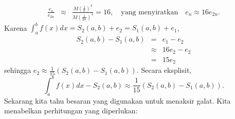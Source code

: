 \begin{description}
\begin{eqnarray*}
\frac{e_{n}}{e_{2n}} & \approx & \frac{M\left(\frac{1}{n}\right)^{4}}{M\left(\frac{1}{2n}\right)^{4}}=16,\quad\mbox{yang menyiratkan}\quad e_{n}\approx16e_{2n}.
\end{eqnarray*}
Karena $\int_{a}^{b}f(x)dx=S_{2}(a,b)+e_{2}=S_{1}(a,b)+e_{1}$,
\begin{eqnarray*}
S_{2}(a,b)-S_{1}(a,b) & = & e_{1}-e_{2}\\
 & \approx & 16e_{2}-e_{2}\\
 & = & 15e_{2}
\end{eqnarray*}
sehingga $e_{2}\approx\frac{1}{15}(S_{2}(a,b)-S_{1}(a,b)).$ Secara
eksplisit, 
\[
\int_{a}^{b}f(x)dx-S_{2}(a,b)\approx\frac{1}{15}(S_{2}(a,b)-S_{1}(a,b)).
\]
Sekarang kita tahu besaran yang digunakan untuk menaksir galat. Kita
menabelkan perhitungan yang diperlukan:


\end{description}
